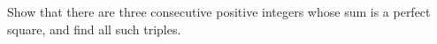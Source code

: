 Show that there are three consecutive positive integers whose sum is a perfect square, and find all such triples.
